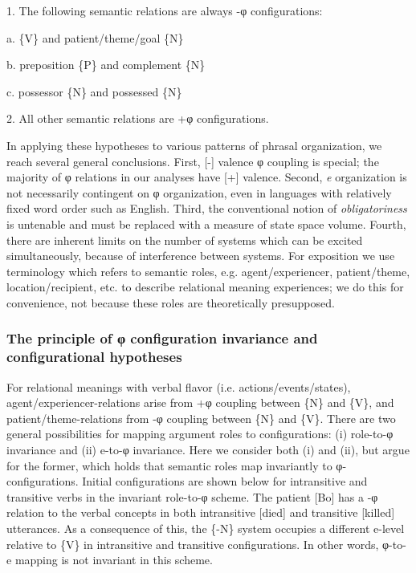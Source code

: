 1. The following semantic relations are always -φ configurations:

  a. \{V\} and patient/theme/goal \{N\}

  b. preposition \{P\} and complement \{N\}

  c. possessor \{N\} and possessed \{N\}

2. All other semantic relations are +φ configurations.

  In applying these hypotheses to various patterns of phrasal organization, we reach several general conclusions. First, [-] valence φ coupling is special; the majority of φ relations in our analyses have [+] valence. Second, \textit{e} organization is not necessarily contingent on φ organization, even in languages with relatively fixed word order such as English. Third, the conventional notion of \textit{obligatoriness} is untenable and must be replaced with a measure of state space volume. Fourth, there are inherent limits on the number of systems which can be excited simultaneously, because of interference between systems. For exposition we use terminology which refers to semantic roles, e.g. agent/experiencer, patient/theme, location/recipient, etc. to describe relational meaning experiences; we do this for convenience, not because these roles are theoretically presupposed.

\subsubsection{The principle of \textup{φ configuration} invariance and configurational hypotheses}

For relational meanings with verbal flavor (i.e. actions/events/states), agent/experiencer-relations arise from +φ coupling between \{N\} and \{V\}, and patient/theme-relations from -φ coupling between \{N\} and \{V\}. There are two general possibilities for mapping argument roles to configurations: (i) role-to-φ invariance and (ii) e-to-φ invariance. Here we consider both (i) and (ii), but argue for the former, which holds that semantic roles map invariantly to φ-configurations. Initial configurations are shown below for intransitive and transitive verbs in the invariant role-to-φ scheme. The patient [Bo] has a -φ relation to the verbal concepts in both intransitive [died] and transitive [killed] utterances. As a consequence of this, the \{-N\} system occupies a different e-level relative to \{V\} in intransitive and transitive configurations. In other words, φ-to-e mapping is not invariant in this scheme.

